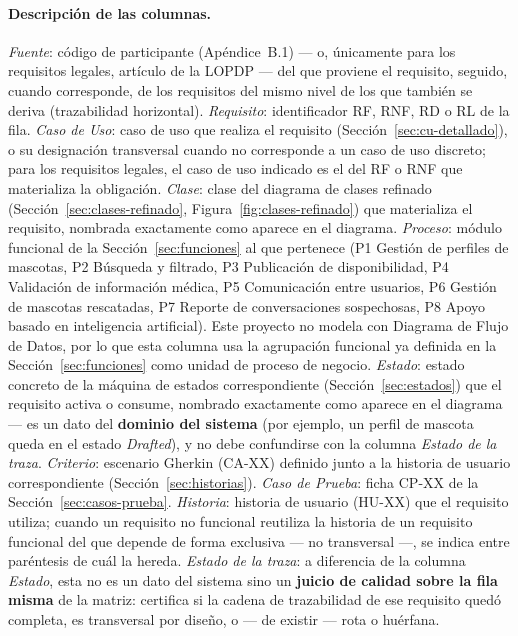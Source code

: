 \documentclass[journal,onecolumn]{IEEEtran}
\begin{document}
\paragraph{Descripción de las columnas.}
\emph{Fuente}: código de participante (Apéndice~B.1) --- o, únicamente
para los requisitos legales, artículo de la LOPDP --- del que proviene el
requisito, seguido, cuando corresponde, de los requisitos del mismo nivel
de los que también se deriva (trazabilidad horizontal). \emph{Requisito}:
identificador RF, RNF, RD o RL de la fila. \emph{Caso de Uso}: caso de uso
que realiza el requisito (Sección~\ref{sec:cu-detallado}), o su
designación transversal cuando no corresponde a un caso de uso discreto;
para los requisitos legales, el caso de uso indicado es el del RF o RNF
que materializa la obligación. \emph{Clase}: clase del diagrama de clases
refinado (Sección~\ref{sec:clases-refinado}, Figura~\ref{fig:clases-refinado}) que
materializa el requisito, nombrada exactamente como aparece en el
diagrama. \emph{Proceso}: módulo funcional de la Sección~\ref{sec:funciones} al que pertenece (P1 Gestión de perfiles de mascotas, P2
Búsqueda y filtrado, P3 Publicación de disponibilidad, P4 Validación de
información médica, P5 Comunicación entre usuarios, P6 Gestión de mascotas
rescatadas, P7 Reporte de conversaciones sospechosas, P8 Apoyo basado en
inteligencia artificial). Este proyecto no modela con Diagrama de Flujo de
Datos, por lo que esta columna usa la agrupación funcional ya definida en
la Sección~\ref{sec:funciones} como unidad de proceso de negocio.
\emph{Estado}: estado concreto de la máquina de estados correspondiente
(Sección~\ref{sec:estados}) que el requisito activa o consume, nombrado
exactamente como aparece en el diagrama --- es un dato del \textbf{dominio
del sistema} (por ejemplo, un perfil de mascota queda en el estado
\emph{Drafted}), y no debe confundirse con la columna \emph{Estado de la
traza}. \emph{Criterio}: escenario Gherkin (CA-XX) definido junto a la
historia de usuario correspondiente (Sección~\ref{sec:historias}).
\emph{Caso de Prueba}: ficha CP-XX de la Sección~\ref{sec:casos-prueba}.
\emph{Historia}: historia de usuario (HU-XX) que el requisito utiliza;
cuando un requisito no funcional reutiliza la historia de un requisito
funcional del que depende de forma exclusiva --- no transversal ---, se
indica entre paréntesis de cuál la hereda. \emph{Estado de la traza}: a
diferencia de la columna \emph{Estado}, esta no es un dato del sistema
sino un \textbf{juicio de calidad sobre la fila misma} de la matriz:
certifica si la cadena de trazabilidad de ese requisito quedó completa, es
transversal por diseño, o --- de existir --- rota o huérfana.
\end{document}
